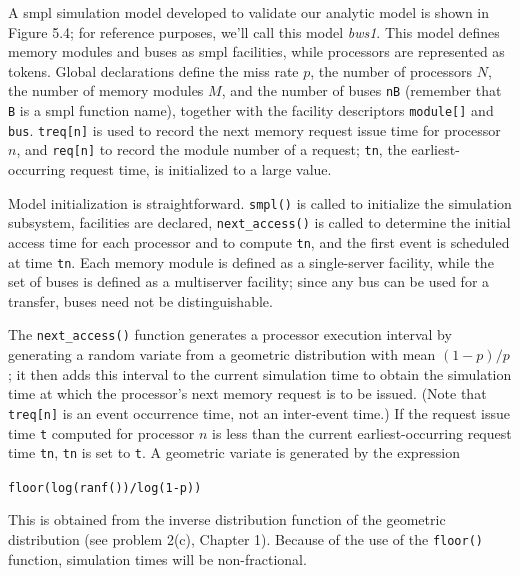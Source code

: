 A smpl simulation model developed to validate our analytic model is
shown in Figure 5.4; for reference purposes, we'll call this model \emph{bws1}. This
model defines memory modules and buses as smpl facilities, while processors
are represented as tokens. Global declarations define the miss rate $p$, the
number of processors $N$, the number of memory modules $M$, and the number of
buses \texttt{nB} (remember that \texttt{B} is a smpl function name), together with the
facility descriptors \texttt{module[]} and \texttt{bus}. \texttt{treq[n]} is used to record the next
memory request issue time for processor $n$, and \texttt{req[n]} to record the module
number of a request; \texttt{tn}, the earliest-occurring request time, is initialized to
a large value.

Model initialization is straightforward. \texttt{smpl()} is called to initialize
the simulation subsystem, facilities are declared, \texttt{next\_access()} is called
to determine the initial access time for each processor and to compute \texttt{tn}, and
the first event is scheduled at time \texttt{tn}. Each memory module is defined as a
single-server facility, while the set of buses is defined as a multiserver
facility; since any bus can be used for a transfer, buses need not be distinguishable.

The \texttt{next\_access()} function generates a processor execution interval by
generating a random variate from a geometric distribution with mean
$(1-p)/p$; it then adds this interval to the current simulation time to obtain
the simulation time at which the processor's next memory request is to be
issued. (Note that \texttt{treq[n]} is an event occurrence time, not an inter-event
time.) If the request issue time \texttt{t} computed for processor $n$ is less than the
current earliest-occurring request time \texttt{tn}, \texttt{tn} is set to \texttt{t}. A geometric variate
is generated by the expression
\begin{center}
\texttt{floor(log(ranf())/log(1-p))}
\end{center}
This is obtained from the inverse distribution function of the geometric
distribution (see problem 2(c), Chapter 1). Because of the use of the \texttt{floor()}
function, simulation times will be non-fractional.

